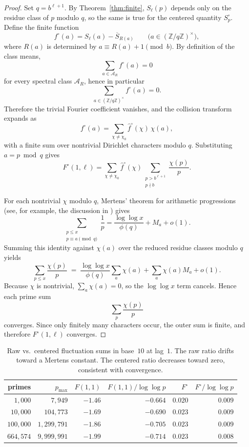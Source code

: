 \documentclass[12pt]{amsart}
\theoremstyle{definition}
\theoremstyle{remark}
\begin{document}
\begin{proof}
Set $q=b^{\ell+1}$. By Theorem~\ref{thm:finite}, $S_{\ell}(p)$
depends only on the residue class of $p$ modulo $q$, so the
same is true for the centered quantity $S_p^\circ$. Define the
finite function
\[
f^\circ(a)=S_\ell(a)-\overline{S}_{R(a)}
\qquad
\bigl(a\in(\mathbb Z/q\mathbb Z)^\times\bigr),
\]
where $R(a)$ is determined by $a\equiv R(a)+1 \pmod b$.
By definition of the class means,
\[
\sum_{a\in \mathcal A_R} f^\circ(a)=0
\]
for every spectral class $\mathcal A_R$, hence in particular
\[
\sum_{a\in (\mathbb Z/q\mathbb Z)^\times} f^\circ(a)=0.
\]
Therefore the trivial Fourier coefficient vanishes, and the
collision transform expands as
\[
f^\circ(a)=\sum_{\chi \ne \chi_0}\hat{f}^{\circ}(\chi)\,\chi(a),
\]
with a finite sum over nontrivial Dirichlet characters modulo $q$.
Substituting $a=p \bmod q$ gives
\[
F^{\circ}(1, \ell)
= \sum_{\chi \ne \chi_0}\hat{f}^{\circ}(\chi)
\sum_{\substack{p>b^{\ell+1}\\ p\nmid b}} \frac{\chi(p)}{p}.
\]

For each nontrivial $\chi$ modulo $q$, Mertens' theorem for
arithmetic progressions (see, for example, the discussion in
\cite[Ch.~22]{davenport}) gives
\[
\sum_{\substack{p \le x \\ p \equiv a \pmod{q}}}
\frac{1}{p} = \frac{\log\log x}{\phi(q)} + M_a + o(1).
\]
Summing this identity against $\chi(a)$ over the reduced residue
classes modulo $q$ yields
\[
\sum_{p \le x} \frac{\chi(p)}{p}
\;=\;
\frac{\log\log x}{\phi(q)}\sum_a \chi(a)
+ \sum_a \chi(a) M_a + o(1).
\]
Because $\chi$ is nontrivial, $\sum_a \chi(a)=0$, so the
$\log\log x$ term cancels. Hence each prime sum
\[
\sum_{p} \frac{\chi(p)}{p}
\]
converges. Since only finitely many characters occur, the outer
sum is finite, and therefore $F^\circ(1,\ell)$ converges.
\end{proof}

\begin{table}[h]
\centering
\begin{tabular}{rrrrrr}
\toprule
primes & $p_{\max}$ & $F(1,1)$ & $F(1,1)/\!\log\!\log p$
& $F^{\circ}$ & $F^{\circ}/\!\log\!\log p$ \\
\midrule
$1{,}000$ & $7{,}949$ & $-1.46$ & $-0.664$
& $0.020$ & $0.009$ \\
$10{,}000$ & $104{,}773$ & $-1.69$ & $-0.690$
& $0.023$ & $0.009$ \\
$100{,}000$ & $1{,}299{,}791$ & $-1.86$ & $-0.705$
& $0.023$ & $0.009$ \\
$664{,}574$ & $9{,}999{,}991$ & $-1.99$ & $-0.714$
& $0.023$ & $0.008$ \\
\bottomrule
\end{tabular}
\caption{Raw vs.\ centered fluctuation sums in base~$10$
at lag~$1$. The raw ratio drifts toward a Mertens constant.
The centered ratio decreases toward zero, consistent with
convergence.}
\label{tab:centered}
\end{table}
\end{document}
